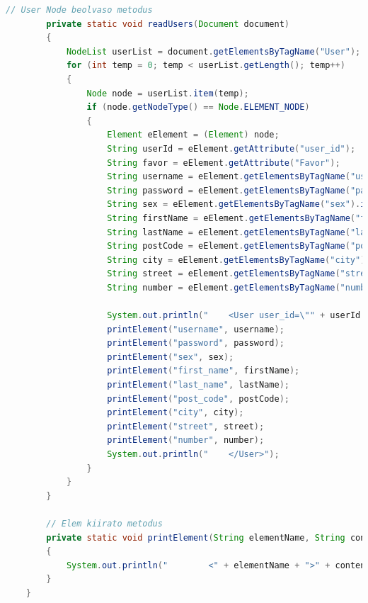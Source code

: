 \documentclass[12pt]{report}
\begin{document}
\begin{lstlisting}[caption={DOMReadKLNSPG.java} olvasó program, language=Java]
		// User Node beolvaso metodus
		private static void readUsers(Document document)
		{
			NodeList userList = document.getElementsByTagName("User");
			for (int temp = 0; temp < userList.getLength(); temp++) 
			{
				Node node = userList.item(temp);
				if (node.getNodeType() == Node.ELEMENT_NODE) 
				{
					Element eElement = (Element) node;
					String userId = eElement.getAttribute("user_id");
					String favor = eElement.getAttribute("Favor");
					String username = eElement.getElementsByTagName("username").item(0).getTextContent();
					String password = eElement.getElementsByTagName("password").item(0).getTextContent();
					String sex = eElement.getElementsByTagName("sex").item(0).getTextContent();
					String firstName = eElement.getElementsByTagName("first_name").item(0).getTextContent();
					String lastName = eElement.getElementsByTagName("last_name").item(0).getTextContent();
					String postCode = eElement.getElementsByTagName("post_code").item(0).getTextContent();
					String city = eElement.getElementsByTagName("city").item(0).getTextContent();
					String street = eElement.getElementsByTagName("street").item(0).getTextContent();
					String number = eElement.getElementsByTagName("number").item(0).getTextContent();
					
					System.out.println("    <User user_id=\"" + userId + "\" Favor=\"" + favor + "\">");
					printElement("username", username);
					printElement("password", password);
					printElement("sex", sex);
					printElement("first_name", firstName);
					printElement("last_name", lastName);
					printElement("post_code", postCode);
					printElement("city", city);
					printElement("street", street);
					printElement("number", number);
					System.out.println("    </User>");
				}
			}
		}
		
		// Elem kiirato metodus
		private static void printElement(String elementName, String content)
		{
			System.out.println("        <" + elementName + ">" + content + "</" + elementName + ">");
		}
	}
\end{lstlisting}
\end{document}

